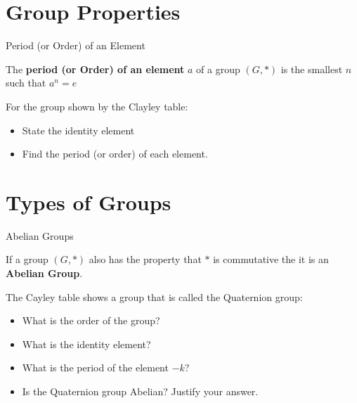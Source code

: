 \documentclass[8pt]{beamer}
\begin{document}
\section{Group Properties}
\begin{frame}{Period (or Order) of an Element}
	\begin{definition}
		The \textbf{period (or Order) of an element} $a$ of a group  $(G,*)$ is the smallest  $n$ such that  $a^n=e$ 
	\end{definition}

	\begin{Problem}
For the group shown by the Clayley table:
\begin{itemize}
	\item State the identity element
	\item Find the period (or order) of each element.
\end{itemize}
	\end{Problem}


\end{frame}
\section{Types of Groups}
\begin{frame}{Abelian Groups}
	\begin{definition}
		If a group $(G,*)$ also has the property that  $*$ is commutative the it is an  \textbf{Abelian Group}.
	\end{definition}

\begin{Problem}
	The Cayley table shows a group that is called the Quaternion group:
	\begin{itemize}
		\item What is the order of the group?
		\item What is the identity element?
		\item What is the period of the element $-k$?
		\item Is the Quaternion group Abelian? Justify your answer.
	\end{itemize}
\end{Problem}

\end{frame}
\end{document}
